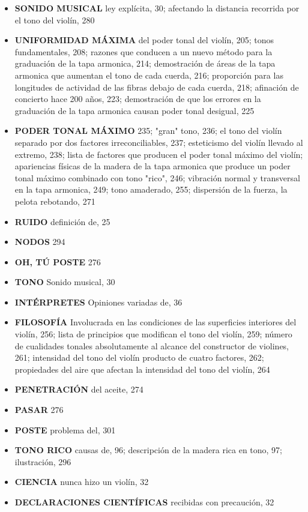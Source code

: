\documentclass[12pt]{book}
\begin{document}
\begin{itemize}
    \item \textbf{SONIDO MUSICAL} ley explícita, 30; afectando la distancia recorrida por el tono del violín, 280
    \item \textbf{UNIFORMIDAD MÁXIMA} del poder tonal del violín, 205; tonos fundamentales, 208; razones que conducen a un nuevo método para la graduación de la tapa armonica, 214; demostración de áreas de la tapa armonica que aumentan el tono de cada cuerda, 216; proporción para las longitudes de actividad de las fibras debajo de cada cuerda, 218; afinación de concierto hace 200 años, 223; demostración de que los errores en la graduación de la tapa armonica causan poder tonal desigual, 225
    \item \textbf{PODER TONAL MÁXIMO} 235; "gran" tono, 236; el tono del violín separado por dos factores irreconciliables, 237; esteticismo del violín llevado al extremo, 238; lista de factores que producen el poder tonal máximo del violín; apariencias físicas de la madera de la tapa armonica que produce un poder tonal máximo combinado con tono "rico", 246; vibración normal y transversal en la tapa armonica, 249; tono amaderado, 255; dispersión de la fuerza, la pelota rebotando, 271
    \item \textbf{RUIDO} definición de, 25
    \item \textbf{NODOS} 294
    \item \textbf{OH, TÚ POSTE} 276
    \item \textbf{TONO} Sonido musical, 30
    \item \textbf{INTÉRPRETES} Opiniones variadas de, 36
    \item \textbf{FILOSOFÍA} Involucrada en las condiciones de las superficies interiores del violín, 256; lista de principios que modifican el tono del violín, 259; número de cualidades tonales absolutamente al alcance del constructor de violines, 261; intensidad del tono del violín producto de cuatro factores, 262; propiedades del aire que afectan la intensidad del tono del violín, 264
    \item \textbf{PENETRACIÓN} del aceite, 274
    \item \textbf{PASAR} 276
    \item \textbf{POSTE} problema del, 301
    \item \textbf{TONO RICO} causas de, 96; descripción de la madera rica en tono, 97; ilustración, 296
    \item \textbf{CIENCIA} nunca hizo un violín, 32
    \item \textbf{DECLARACIONES CIENTÍFICAS} recibidas con precaución, 32

\end{itemize}
\end{document}
